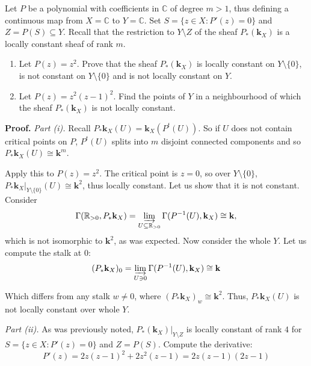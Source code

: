 \documentclass{category-template}
\begin{document}
\begin{problem}
    Let $P$ be a polynomial with coefficients in $\mathbb{C}$ of degree $m>1$,
    thus defining a continuous map from $X=\mathbb{C}$ to $Y=\mathbb{C}$. Set 
    $S = \{z \in X: P'(z) = 0\}$ and $Z=P(S) \subseteq Y$. Recall that 
    the restriction to $Y \setminus Z$ of the sheaf $P_*(\mathbf{k}_X)$ is 
    a locally constant sheaf of rank $m$.
    \begin{enumerate}
        \item[(i)] Let $P(z)=z^2$. Prove that the sheaf $P_*(\mathbf{k}_X)$
        is locally constant on $Y \setminus \{0\}$, is not constant on 
        $Y \setminus \{0\}$ and is not locally constant on $Y$.
        \item[(ii)] Let $P(z)=z^2(z-1)^2$. Find the points of $Y$ in a neighbourhood
        of which the sheaf $P_*(\mathbf{k}_X)$ is not locally constant.
    \end{enumerate}
\end{problem}

\textbf{Proof.} \textit{Part (i).} Recall $P_*\mathbf{k}_X(U) =
\mathbf{k}_X(P^t(U))$. So if $U$ does not contain critical points on $P$,
$P^t(U)$ splits into $m$ disjoint connected components and so
$P_*\mathbf{k}_X(U) \cong \mathbf{k}^m$. 

Apply this to $P(z)=z^2$. The critical point is $z=0$, so over $Y \setminus
\{0\}$, $P_*\mathbf{k}_X|_{Y \setminus \{0\}}(U) \cong \mathbf{k}^2$, thus
locally constant. Let us show that it is not constant. Consider
\begin{equation*}
    \Gamma(\mathbb{R}_{>0}, P_*\mathbf{k}_X) = \varinjlim_{U \subseteq \mathbb{R}_{>0}} \Gamma(P^{-1}(U), \mathbf{k}_X) \cong \mathbf{k},
\end{equation*}
which is not isomorphic to $\mathbf{k}^2$, as was expected. Now consider 
the whole $Y$. Let us compute the stalk at $0$:
\begin{equation*}
    (P_*\mathbf{k}_X)_0 = \varinjlim_{U \ni 0} \Gamma(P^{-1}(U), \mathbf{k}_X) \cong \mathbf{k}
\end{equation*}

Which differs from any stalk $w \neq 0$, where $(P_*\mathbf{k}_X)_w \cong
\mathbf{k}^2$. Thus, $P_*\mathbf{k}_X(U)$ is not locally constant over whole
$Y$.

\textit{Part (ii).} As was previously noted, $P_*(\mathbf{k}_X)|_{Y \setminus
Z}$ is locally constant of rank $4$ for $S=\{z \in X: P'(z) = 0\}$ and $Z=P(S)$. Compute the
derivative:
\begin{equation*}
    P'(z) = 2z(z-1)^2 + 2z^2(z-1) = 2z(z-1)(2z-1)
\end{equation*}
\end{document}
